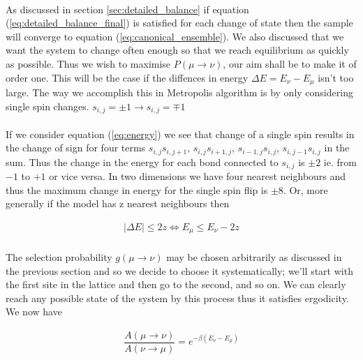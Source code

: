 \documentclass[12pt] {report} %
\begin{document}
				\paragraph{}
					As discussed in section \ref{sec:detailed_balance} if equation (\ref{eq:detailed_balance_final}) is satisfied for each change of state then the sample will converge to equation (\ref{eq:canonical_ensemble}). We also discussed that we want the system to change often enough so that we reach equilibrium as quickly as possible. Thus we wish to maximise $P(\mu \rightarrow \nu)$, our aim shall be to make it of order one. This will be the case if the diffences in energy $\Delta E = E_\nu - E_\mu$ isn't too large. The way we accomplish this in Metropolis algorithm is by only considering single spin changes. $s_{i,j} = \pm 1 \rightarrow s_{i,j} = \mp 1$
					
				\paragraph{}
					If we consider equation (\ref{eq:energy}) we see that change of a single spin results in the change of sign for four terms $s_{i,j}s_{i,j+1}$, $s_{i,j}s_{i+1,j}$, $s_{i-1,j}s_{i,j}$, $s_{i,j-1}s_{i,j}$ in the sum. Thus the change in the energy for each bond connected to $s_{i,j}$ is $\pm 2$ ie. from $-1$ to $+1$ or vice versa. In two dimensions we have four nearest neighbours and thus the maximum change in energy for the single spin flip is $\pm 8$. Or, more generally if the model has z nearest neighbours then
					
					\begin{align}
						\left| \Delta E \right| \leq 2z \Leftrightarrow E_\mu \leq E_\nu - 2z	\label{degeneracy_energy}
					\end{align}

				\paragraph{}
					The selection probability $g(\mu \rightarrow \nu)$ may be chosen arbitrarily as discussed in the previous section and so we decide to choose it systematically; we'll start with the first site in the lattice and then go to the second, and so on. We can clearly reach any possible state of the system by this process thus it satisfies ergodicity. We now have
					
				\begin{align}
					\dfrac{A(\mu \rightarrow \nu)}{A(\nu \rightarrow \mu)} =  e^{- \beta (E_\nu - E_\mu)} \label{eq:acceptance_ratio}
				\end{align}
				
\end{document}
